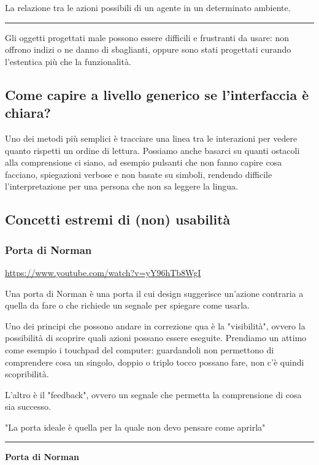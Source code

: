 \documentclass[11pt,a4paper]{book}
\begin{document}
La relazione tra le azioni possibili di un agente in un determinato ambiente.

\noindent\rule{\textwidth}{1pt}

Gli oggetti progettati male possono essere difficili e frustranti da usare: non offrono indizi o ne danno di sbaglianti, oppure sono stati progettati curando l'estentica più che la funzionalità.

\subsection{Come capire a livello generico se l'interfaccia è chiara?}
Uno dei metodi più semplici è tracciare una linea tra le interazioni per vedere quanto rispetti un ordine di lettura. Possiamo anche basarci su quanti ostacoli alla comprensione ci siano, ad esempio pulsanti che non fanno capire cosa facciano, spiegazioni verbose e non basate su simboli, rendendo difficile l'interpretazione per una persona che non sa leggere la lingua. 

\subsection{Concetti estremi di (non) usabilità}
\subsubsection{Porta di Norman} \label{par: porta di norman}
\href{It's not you. Bad doors are everywhere.}{https://www.youtube.com/watch?v=yY96hTb8WgI}

Una porta di Norman è una porta il cui design suggerisce un'azione contraria a quella da fare o che richiede un segnale per spiegare come usarla.

Uno dei principi che possono andare in correzione qua è la "visibilità", ovvero la possibilità di scoprire quali azioni possano essere eseguite. Prendiamo un attimo come esempio i touchpad del computer: guardandoli non permettono di comprendere cosa un singolo, doppio o triplo tocco possano fare, non c'è quindi scopribilità.

L'altro è il "feedback", ovvero un segnale che permetta la comprensione di cosa sia successo.

"La porta ideale è quella per la quale non devo pensare come aprirla"


\noindent\rule{\textwidth}{1pt}
\begin{center}
	\textbf{Porta di Norman}
\end{center}
\end{document}

